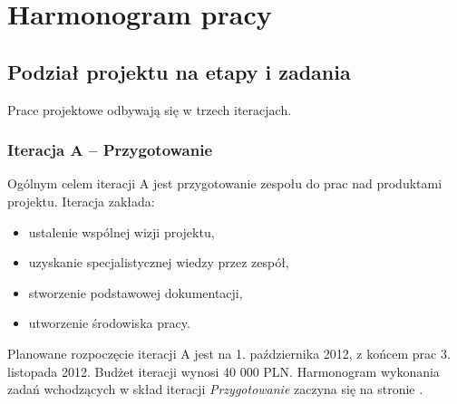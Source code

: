 \newpage
\section{Harmonogram pracy}

\subsection{Podział projektu na etapy i zadania}

Prace projektowe odbywają się w trzech iteracjach.

\subsubsection{Iteracja A -- Przygotowanie}
Ogólnym celem iteracji A jest przygotowanie zespołu do prac nad produktami
projektu. Iteracja zakłada:
\begin{itemize}[nosep]
     \item ustalenie wspólnej wizji projektu,
     \item uzyskanie specjalistycznej wiedzy przez zespół,
     \item stworzenie podstawowej dokumentacji,
     \item utworzenie środowiska pracy.
 \end{itemize}

\noindent Planowane rozpoczęcie iteracji A jest na 1. października 2012, z
końcem prac 3. listopada 2012. Budżet iteracji wynosi 40 000 PLN. Harmonogram
wykonania zadań wchodzących w skład iteracji \emph{Przygotowanie} zaczyna się na
stronie \pageref{fig:harmonogram:iteracja_przygotowanie}.

